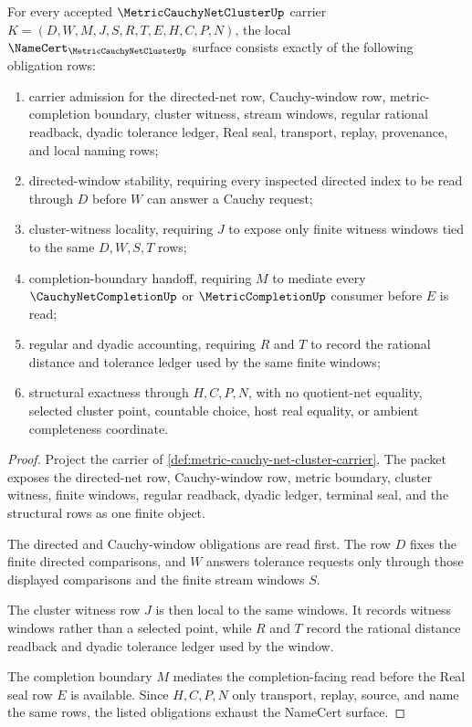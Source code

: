 \begin{theorem}
\label{thm:metric-cauchy-net-cluster-namecert-obligations}
For every accepted $\MetricCauchyNetClusterUp$ carrier $K=(D,W,M,J,S,R,T,E,H,C,P,N)$, the local $\NameCert_{\MetricCauchyNetClusterUp}$ surface consists exactly of the following obligation rows:
\begin{enumerate}
\item carrier admission for the directed-net row, Cauchy-window row, metric-completion boundary, cluster witness, stream windows, regular rational readback, dyadic tolerance ledger, Real seal, transport, replay, provenance, and local naming rows;
\item directed-window stability, requiring every inspected directed index to be read through $D$ before $W$ can answer a Cauchy request;
\item cluster-witness locality, requiring $J$ to expose only finite witness windows tied to the same $D,W,S,T$ rows;
\item completion-boundary handoff, requiring $M$ to mediate every $\CauchyNetCompletionUp$ or $\MetricCompletionUp$ consumer before $E$ is read;
\item regular and dyadic accounting, requiring $R$ and $T$ to record the rational distance and tolerance ledger used by the same finite windows;
\item structural exactness through $H,C,P,N$, with no quotient-net equality, selected cluster point, countable choice, host real equality, or ambient completeness coordinate.
\end{enumerate}
\end{theorem}
\begin{proof}
Project the carrier of \autoref{def:metric-cauchy-net-cluster-carrier}. The packet exposes the directed-net row, Cauchy-window row, metric boundary, cluster witness, finite windows, regular readback, dyadic ledger, terminal seal, and the structural rows as one finite object.

The directed and Cauchy-window obligations are read first. The row $D$ fixes the finite directed comparisons, and $W$ answers tolerance requests only through those displayed comparisons and the finite stream windows $S$.

The cluster witness row $J$ is then local to the same windows. It records witness windows rather than a selected point, while $R$ and $T$ record the rational distance readback and dyadic tolerance ledger used by the window.

The completion boundary $M$ mediates the completion-facing read before the Real seal row $E$ is available. Since $H,C,P,N$ only transport, replay, source, and name the same rows, the listed obligations exhaust the NameCert surface.
\end{proof}

